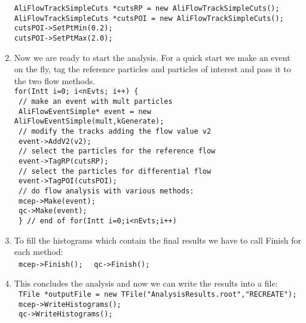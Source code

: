 \begin{enumerate}
\texttt{AliFlowTrackSimpleCuts *cutsRP = new AliFlowTrackSimpleCuts();}\\
\texttt{AliFlowTrackSimpleCuts *cutsPOI = new AliFlowTrackSimpleCuts();}\\
\texttt{cutsPOI->SetPtMin(0.2);}\\
\texttt{cutsPOI->SetPtMax(2.0);}\\
\item
Now we are ready to start the analysis.  
For a quick start we make an event on the fly, tag the reference particles and particles of interest  and pass it to the two flow methods. \\
\texttt{for(Int\textunderscore t i=0; i<nEvts; i++) \{}\\
\texttt{      // make an event with mult particles }\\
\texttt{      AliFlowEventSimple* event = new AliFlowEventSimple(mult,kGenerate);}\\
\texttt{      // modify the tracks adding the flow value v2}\\
\texttt{       event->AddV2(v2);}\\
\texttt{      // select the particles for the reference flow}\\
\texttt{      event->TagRP(cutsRP);}\\
\texttt{      // select the particles for differential flow}\\
\texttt{      event->TagPOI(cutsPOI);}\\
\texttt{      // do flow analysis with various methods:}\\
\texttt{      mcep->Make(event);}\\
\texttt{      qc->Make(event);}\\
\texttt{    \} // end of for(Int\textunderscore t i=0;i<nEvts;i++)}\\
\item
To fill the histograms which contain the final results we have to call Finish for each method:\\
\texttt{ mcep->Finish(); }  \texttt{ qc->Finish(); }\\
\item
This concludes the analysis and now we can write the results into a file:\\
\texttt{ TFile *outputFile = new TFile("AnalysisResults.root","RECREATE");}\\
\texttt{ mcep->WriteHistograms();}\\
\texttt{ qc->WriteHistograms();}\\

\end{enumerate}